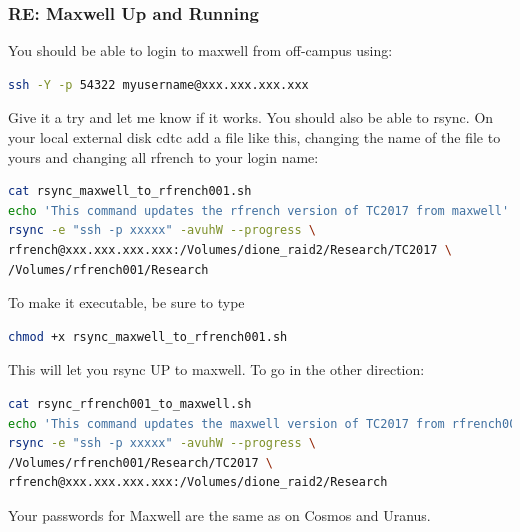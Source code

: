 \documentclass[crop=false,class=article,oneside]{standalone}
\begin{document}
\subsubsection{\footnotesize RE: Maxwell Up and Running}
You should be able to login to maxwell from off-campus using:
\begin{lstlisting}[language=bash,basicstyle=\footnotesize]
ssh -Y -p 54322 myusername@xxx.xxx.xxx.xxx
\end{lstlisting}
Give it a try and let me know if it works. 
You should also be able to rsync. On your local external disk
cdtc
add a file like this, changing the name of the file to yours and changing all rfrench to your login name:
\begin{lstlisting}[language=bash,basicstyle=\footnotesize]
cat rsync_maxwell_to_rfrench001.sh
echo 'This command updates the rfrench version of TC2017 from maxwell'
rsync -e "ssh -p xxxxx" -avuhW --progress \
rfrench@xxx.xxx.xxx.xxx:/Volumes/dione_raid2/Research/TC2017 \
/Volumes/rfrench001/Research
\end{lstlisting}
To make it executable, be sure to type
\begin{lstlisting}[language=bash,basicstyle=\footnotesize]
chmod +x rsync_maxwell_to_rfrench001.sh
\end{lstlisting}
This will let you rsync UP to maxwell. To go in the other direction:
\begin{lstlisting}[language=bash,basicstyle=\footnotesize]
cat rsync_rfrench001_to_maxwell.sh
echo 'This command updates the maxwell version of TC2017 from rfrench001'
rsync -e "ssh -p xxxxx" -avuhW --progress \
/Volumes/rfrench001/Research/TC2017 \
rfrench@xxx.xxx.xxx.xxx:/Volumes/dione_raid2/Research
\end{lstlisting}
Your passwords for Maxwell are the same as on Cosmos and Uranus.
\end{document}

